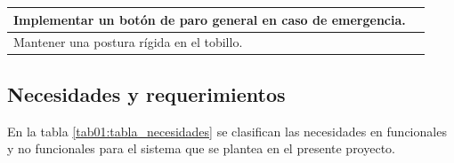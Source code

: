 \begin{table}[h!]
{\begin{tabular}{|m{10.5cm}|m{8.5cm}|}
		Implementar   un botón de paro general en caso de emergencia.                                                                         &                                                                                                         \\ \hline
		Mantener   una postura rígida en el tobillo.                                                                                          &                                                                                                         \\ \hline
	\end{tabular}}
\end{table}
\subsection{Necesidades y requerimientos}
En la tabla \ref{tab01:tabla_necesidades} se clasifican las necesidades en funcionales y no funcionales para el sistema que se plantea en el presente proyecto.

